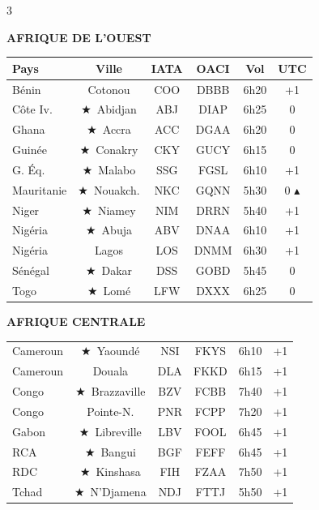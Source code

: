 \documentclass[9pt,a4paper,landscape]{article}
\newcommand{\CAP}{\textcolor{capgold}{$\bigstar$}}
\newcommand{\CORR}{\textcolor{afred}{$\blacktriangle$}}
\begin{document}
\begin{multicols}{3}
\scriptsize

\textbf{\color{afrgreen}AFRIQUE DE L'OUEST}\\[-0.1cm]
\begin{tabular}{@{}l c c c c c@{}}
\toprule
\textbf{Pays} & \textbf{Ville} & \textbf{IATA} & \textbf{OACI} & \textbf{Vol} & \textbf{UTC} \\
\midrule
\rowcolor{afrlight} Bénin & Cotonou & COO & DBBB & 6h20 & +1 \\
Côte Iv. & \CAP\ Abidjan & ABJ & DIAP & 6h25 & 0 \\
\rowcolor{afrlight} Ghana & \CAP\ Accra & ACC & DGAA & 6h20 & 0 \\
Guinée & \CAP\ Conakry & CKY & GUCY & 6h15 & 0 \\
\rowcolor{afrlight} G. Éq. & \CAP\ Malabo & SSG & FGSL & 6h10 & +1 \\
Mauritanie & \CAP\ Nouakch. & NKC & GQNN & 5h30 & 0 \CORR \\
\rowcolor{afrlight} Niger & \CAP\ Niamey & NIM & DRRN & 5h40 & +1 \\
Nigéria & \CAP\ Abuja & ABV & DNAA & 6h10 & +1 \\
\rowcolor{afrlight} Nigéria & Lagos & LOS & DNMM & 6h30 & +1 \\
Sénégal & \CAP\ Dakar & DSS & GOBD & 5h45 & 0 \\
\rowcolor{afrlight} Togo & \CAP\ Lomé & LFW & DXXX & 6h25 & 0 \\
\bottomrule
\end{tabular}

\vspace{0.15cm}
\textbf{\color{afrgreen}AFRIQUE CENTRALE}\\[-0.1cm]
\begin{tabular}{@{}l c c c c c@{}}
\toprule
\rowcolor{afrlight} Cameroun & \CAP\ Yaoundé & NSI & FKYS & 6h10 & +1 \\
Cameroun & Douala & DLA & FKKD & 6h15 & +1 \\
\rowcolor{afrlight} Congo & \CAP\ Brazzaville & BZV & FCBB & 7h40 & +1 \\
Congo & Pointe-N. & PNR & FCPP & 7h20 & +1 \\
\rowcolor{afrlight} Gabon & \CAP\ Libreville & LBV & FOOL & 6h45 & +1 \\
RCA & \CAP\ Bangui & BGF & FEFF & 6h45 & +1 \\
\rowcolor{afrlight} RDC & \CAP\ Kinshasa & FIH & FZAA & 7h50 & +1 \\
Tchad & \CAP\ N'Djamena & NDJ & FTTJ & 5h50 & +1 \\
\bottomrule
\end{tabular}


\end{multicols}
\end{document}
